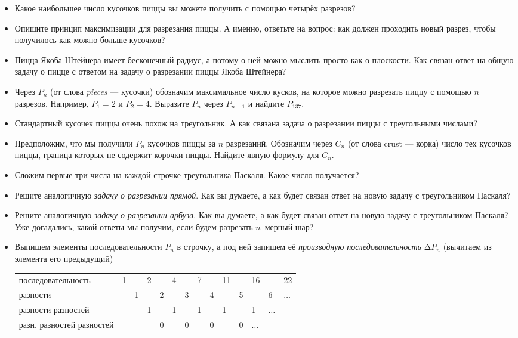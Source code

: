 \begin{itemize}
\item Какое наибольшее число кусочков пиццы вы можете получить с помощью четырёх разрезов?
\item Опишите принцип максимизации для разрезания пиццы. А именно, ответьте на вопрос: как должен проходить новый разрез, чтобы получилось как можно больше кусочков?
\item Пицца Якоба Штейнера имеет бесконечный радиус, а потому о ней можно мыслить просто как о плоскости. Как связан ответ на общую задачу о пицце с ответом на задачу о разрезании пиццы Якоба Штейнера?
\item Через $P_n$ (от слова {\itshape pieces} --- кусочки) обозначим максимальное число кусков, на которое можно разрезать пиццу с помощью $n$ разрезов. Например, $P_1 = 2$ и $P_2 = 4$. Выразите $P_n$ через $P_{n-1}$ и найдите $P_{137}$.
\item Стандартный кусочек пиццы очень похож на треугольник. А как связана задача о разрезании пиццы с треугольными числами?
\item Предположим, что мы получили $P_n$ кусочков пиццы за $n$ разрезаний. Обозначим через $C_n$ (от слова crust --- корка) число тех кусочков пиццы, граница которых не содержит корочки пиццы. Найдите явную формулу для $C_n$.
\item Сложим первые три числа на каждой строчке треугольника Паскаля. Какое число получается?
\item Решите аналогичную {\itshape задачу о разрезании прямой}. Как вы думаете, а как будет связан ответ на новую задачу с треугольником Паскаля?
\item Решите аналогичную {\itshape задачу о разрезании арбуза}. Как вы думаете, а как будет связан ответ на новую задачу с треугольником Паскаля? Уже догадались, какой ответы мы получим, если будем разрезать $n$--мерный шар?

\item Выпишем элементы последовательности $P_n$ в строчку, а под ней запишем её {\itshape производную последовательность} $\text{Δ} P_n$ (вычитаем из элемента его предыдущий)

\begin{center} \scriptsize \begin{tabular}{llllllllllllll}
	\hline
	{\tiny последовательность} & 1 & & 2 & & 4 & & 7 & & 11 & & 16 & & 22\\
	{\tiny разности} & & 1 & & 2 & & 3 & & 4 & & 5 & & 6 & $\ldots$ \\
	{\tiny разности разностей} & & & 1 & & 1 & & 1 & & 1 & & 1 & $\ldots$ \\
	{\tiny разн. разностей разностей} & & & & 0 & & 0 & & 0 & & 0 & $\ldots$ \\
	\hline
\end{tabular} \end{center} \medskip


\end{itemize}
